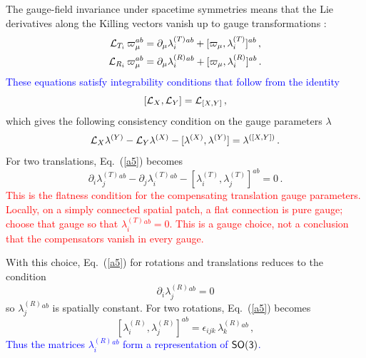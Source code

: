 \documentclass [prd,reprint,eqsecnum,nofootinbib]  {revtex4-1}
\newcommand{\lang}[1]{\textcolor{blue}{#1}}
\newcommand{\science}[1]{\textcolor{red}{#1}}
\begin{document}
The gauge-field invariance under spacetime symmetries means that the
Lie derivatives along the Killing vectors vanish up to gauge
transformations \cite{Forgacs:1979zs,Jackiw:1979ub}:
\begin{align}
    {\cal L}_{T_i}\,\varpi_\mu^{ab} &= \partial_\mu \lambda^{(T)}_i{}^{ab}
    + [\varpi_\mu,\lambda^{(T)}_i]^{ab}\,,\label{a3}\\  {\cal L}_{R_i}\,\varpi_\mu^{ab} &= \partial_\mu \lambda^{(R)}_i{}^{ab}
    + [\varpi_\mu,\lambda^{(R)}_i]^{ab}\,.\label{a4}
\end{align}
\lang{These equations satisfy integrability conditions that follow
from the identity}
$$
[{\cal L}_X, {\cal L}_Y] = {\cal L}_{[X,Y]}\, ,
$$
which gives the following consistency condition on the gauge parameters
$\lambda$
\begin{equation}\label{a5}
{\cal L}_X\lambda^{(Y)}-{\cal L}_Y\lambda^{(X)}
-[\lambda^{(X)},\lambda^{(Y)}] =\lambda^{([X,Y])}\,.
\end{equation}
For two translations, Eq.~(\ref{a5}) becomes
\begin{equation}\label{a6}
    \partial_i\lambda^{(T)}_j{}^{ab}-
    \partial_j\lambda^{(T)}_i{}^{ab} -
    [\lambda^{(T)}_i,\lambda^{(T)}_j]^{ab}=0\, .
\end{equation}
\science{This is the flatness condition for the compensating
translation gauge parameters. Locally, on a simply connected spatial
patch, a flat connection is pure gauge; choose that gauge so that
$\lambda^{(T)}_i{}^{ab}=0$. This is a gauge choice, not a conclusion
that the compensators vanish in every gauge.}

With this choice, Eq.~(\ref{a5}) for rotations and translations
reduces to the condition
$$
\partial_i\lambda^{(R)}_j{}^{ab}=0
$$
so $\lambda^{(R)}_j{}^{ab}$ is spatially constant. For two
rotations, Eq.~(\ref{a5}) becomes
\begin{equation}\label{a7}
    [\lambda^{(R)}_i,\lambda^{(R)}_j]^{ab}=\epsilon_{ijk}\,
    \lambda^{(R)}_k{}^{ab}\,,
\end{equation}
\lang{Thus the matrices $\lambda^{(R)}_i{}^{ab}$ form a
representation of $\sf{SO(3)}$.}
\end{document}
